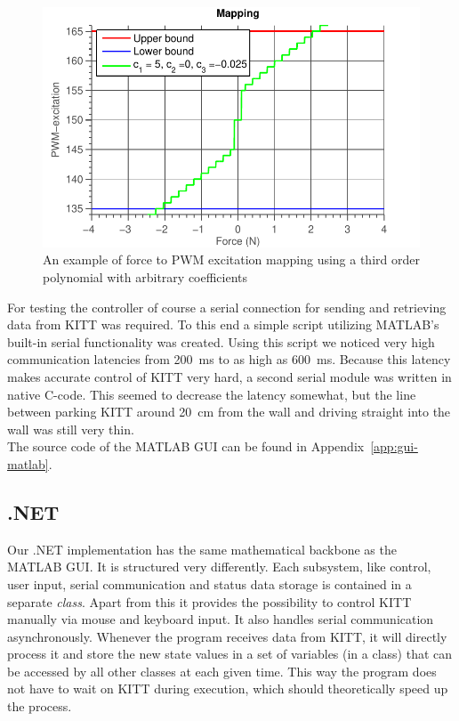 \documentclass[11pt,titlepage]{report}
\begin{document}
\begin{figure}[H]
	\centering
	\includegraphics[width=0.7\linewidth]{resource/mapping.pdf}
	\caption{An example of force to PWM excitation mapping using a third order polynomial with arbitrary coefficients}
	\label{fig:int-mapping}
\end{figure}

For testing the controller of course a serial connection for sending and retrieving data from KITT was required. To this end a simple script utilizing MATLAB's built-in serial functionality was created. Using this script we noticed very high communication latencies from \SI{200}{ms} to as high as \SI{600}{ms}. Because this latency makes accurate control of KITT very hard, a second serial module was written in native C-code. This seemed to decrease the latency somewhat, but the line between parking KITT around \SI{20}{cm} from the wall and driving straight into the wall was still very thin.
\\
The source code of the MATLAB GUI can be found in Appendix~\ref{app:gui-matlab}.

\subsection{.NET}
Our .NET implementation has the same mathematical backbone as the MATLAB GUI. It is structured very differently. Each subsystem, like control, user input, serial communication and status data storage is contained in a separate \textit{class}. Apart from this it provides the possibility to control KITT manually via mouse and keyboard input. It also handles serial communication asynchronously. Whenever the program receives data from KITT, it will directly process it and store the new state values in a set of variables (in a class) that can be accessed by all other classes at each given time. This way the program does not have to wait on KITT during execution, which should theoretically speed up the process.
\end{document}

